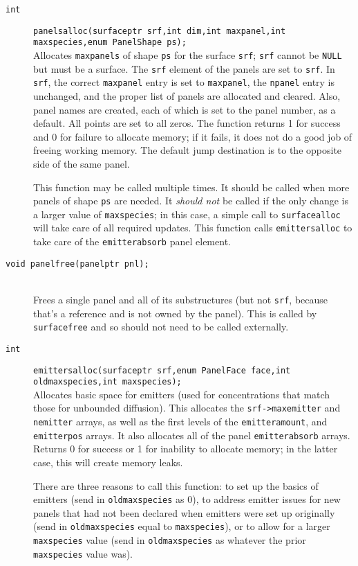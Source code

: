 \documentclass {book}
\begin{document}
\begin{description}
\item[\texttt{int}]
\texttt{panelsalloc(surfaceptr srf,int dim,int maxpanel,int maxspecies,enum PanelShape ps);}
\hfill \\
Allocates \texttt{maxpanels} of shape \texttt{ps} for the surface \texttt{srf}; \texttt{srf} cannot be \texttt{NULL} but must be a surface. The \texttt{srf} element of the panels are set to \texttt{srf}. In \texttt{srf}, the correct \texttt{maxpanel} entry is set to \texttt{maxpanel}, the \texttt{npanel} entry is unchanged, and the proper list of panels are allocated and cleared. Also, panel names are created, each of which is set to the panel number, as a default. All points are set to all zeros. The function returns 1 for success and 0 for failure to allocate memory; if it fails, it does not do a good job of freeing working memory. The default jump destination is to the opposite side of the same panel.

This function may be called multiple times. It should be called when more panels of shape \texttt{ps} are needed. It \emph{should not} be called if the only change is a larger value of \texttt{maxspecies}; in this case, a simple call to \texttt{surfacealloc} will take care of all required updates. This function calls \texttt{emittersalloc} to take care of the \texttt{emitterabsorb} panel element.

\item[\texttt{void panelfree(panelptr pnl);}]
\hfill \\
Frees a single panel and all of its substructures (but not \texttt{srf}, because that's a reference and is not owned by the panel). This is called by \texttt{surfacefree} and so should not need to be called externally.

\item[\texttt{int}]
\texttt{emittersalloc(surfaceptr srf,enum PanelFace face,int oldmaxspecies,int maxspecies);}
\hfill \\
Allocates basic space for emitters (used for concentrations that match those for unbounded diffusion). This allocates the \texttt{srf->maxemitter} and \texttt{nemitter} arrays, as well as the first levels of the \texttt{emitteramount}, and \texttt{emitterpos} arrays. It also allocates all of the panel \texttt{emitterabsorb} arrays. Returns 0 for success or 1 for inability to allocate memory; in the latter case, this will create memory leaks.

There are three reasons to call this function: to set up the basics of emitters (send in \texttt{oldmaxspecies} as 0), to address emitter issues for new panels that had not been declared when emitters were set up originally (send in \texttt{oldmaxspecies} equal to \texttt{maxspecies}), or to allow for a larger \texttt{maxspecies} value (send in \texttt{oldmaxspecies} as whatever the prior \texttt{maxspecies} value was).


\end{description}
\end{document}
